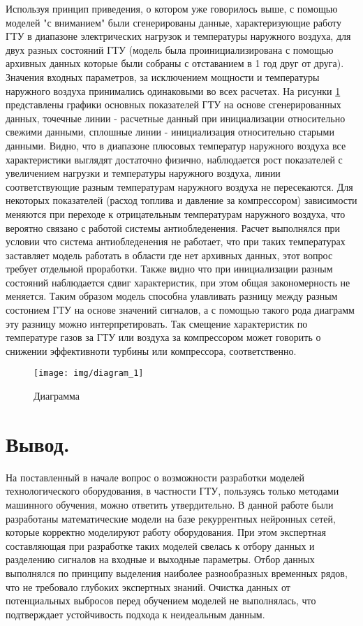 \documentclass[12pt,a4paper]{article}
\begin{document}
Используя принцип приведения, о котором уже говорилось выше, с помощью моделей "с вниманием" были сгенерированы данные, характеризующие работу ГТУ в диапазоне электрических нагрузок и температуры наружного воздуха, для двух разных состояний ГТУ (модель была проинициализирована с помощью архивных данных которые были собраны с отставанием в 1 год друг от друга). Значения входных параметров, за исключением мощности и температуры наружного воздуха принимались одинаковыми во всех расчетах. На рисунки \ref{fig:diagram_1} представлены графики основных показателей ГТУ на основе сгенерированных данных, точечные линии - расчетные данный при инициализации относительно свежими данными, сплошные линии - инициализация относительно старыми данными. Видно, что в диапазоне плюсовых температур наружного воздуха все характеристики выглядят достаточно физично, наблюдается рост показателей с увеличением нагрузки и температуры наружного воздуха, линии соответствующие разным температурам наружного воздуха не пересекаются. Для некоторых показателей (расход топлива и давление за компрессором) зависимости меняются при переходе к отрицательным температурам наружного воздуха, что вероятно связано с работой системы антиобледенения. Расчет выполнялся при условии что система антиобледенения не работает, что при таких температурах заставляет модель работать в области где нет архивных данных, этот вопрос требует отдельной проработки. Также видно что при инициализации разным состояний наблюдается сдвиг характеристик, при этом общая закономерность не меняется. Таким образом модель способна улавливать разницу между разным состонием ГТУ на основе значений сигналов, а с помощью такого рода диаграмм эту разницу можно интерпретировать. Так смещение характеристик по температуре газов за ГТУ или воздуха за компрессором может говорить о снижении эффективноти турбины или компрессора, соответственно.

\begin{figure}[htbp]
	\centering\texttt{[image: img/diagram\_1]}
	\caption{Диаграмма}
	\label{fig:diagram_1}
\end{figure}




\newpage
\section{Вывод.}

На поставленный в начале вопрос о возможности разработки моделей технологического оборудования, в частности ГТУ, пользуясь только методами машинного обучения, можно ответить утвердительно. В данной работе были разработаны математические модели на базе рекуррентных нейронных сетей, которые корректно моделируют работу оборудования. При этом экспертная составляющая при разработке таких моделей свелась к отбору данных и разделению сигналов на входные и выходные параметры. Отбор данных выполнялся по принципу выделения наиболее разнообразных временных рядов, что не требовало глубоких экспертных знаний. Очистка данных от потенциальных выбросов перед обучением моделей не выполнялась, что подтверждает устойчивость подхода к неидеальным данным.
\end{document}
